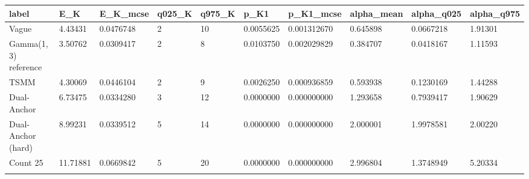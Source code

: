 \begin{longtable}{llllllllll}
\toprule
label & E\_K & E\_K\_mcse & q025\_K & q975\_K & p\_K1 & p\_K1\_mcse & alpha\_mean & alpha\_q025 & alpha\_q975 \\
\midrule\endhead
Vague & 4.43431 & 0.0476748 & 2 & 10 & 0.0055625 & 0.001312670 & 0.645898 & 0.0667218 & 1.91301 \\ \addlinespace[3pt]
Gamma(1, 3) reference & 3.50762 & 0.0309417 & 2 & 8 & 0.0103750 & 0.002029829 & 0.384707 & 0.0418167 & 1.11593 \\ \addlinespace[3pt]
TSMM & 4.30069 & 0.0446104 & 2 & 9 & 0.0026250 & 0.000936859 & 0.593938 & 0.1230169 & 1.44288 \\ \addlinespace[3pt]
Dual-Anchor & 6.73475 & 0.0334280 & 3 & 12 & 0.0000000 & 0.000000000 & 1.293658 & 0.7939417 & 1.90629 \\ \addlinespace[3pt]
Dual-Anchor (hard) & 8.99231 & 0.0339512 & 5 & 14 & 0.0000000 & 0.000000000 & 2.000001 & 1.9978581 & 2.00220 \\ \addlinespace[3pt]
Count 25 & 11.71881 & 0.0669842 & 5 & 20 & 0.0000000 & 0.000000000 & 2.996804 & 1.3748949 & 5.20334 \\ \addlinespace[3pt]
\bottomrule\end{longtable}
